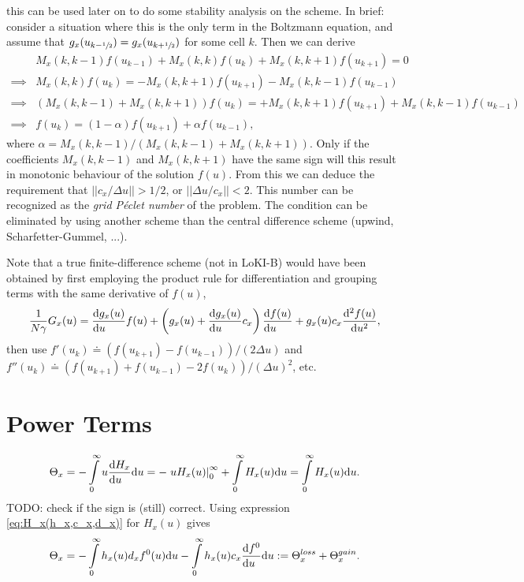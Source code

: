 \documentclass{book}
\newcommand{\frachalf}{\ensuremath{\sfrac{1}{2}}}
\newcommand{\phalf}[1]{\ensuremath{{#1}+\frachalf}}
\newcommand{\mhalf}[1]{\ensuremath{{#1}-\frachalf}}
\begin{document}
this can be used later on to do some stability analysis on the scheme. In brief:
consider a situation where this is the only term in the Boltzmann equation, and
assume that $g_x(u_{\mhalf{k}})=g_x(u_{\phalf{k}})$ for some cell $k$. Then we can
derive
\begin{align}
  &M_x(k,k-1)f(u_{k-1}) + M_x(k,k)f(u_k) + M_x(k,k+1)f(u_{k+1}) = 0 \nonumber \\
  \implies & M_x(k,k)f(u_k) = - M_x(k,k+1)f(u_{k+1}) - M_x(k,k-1)f(u_{k-1}) \nonumber \\
  \implies & (M_x(k,k-1)+M_x(k,k+1))f(u_k) = + M_x(k,k+1)f(u_{k+1}) + M_x(k,k-1)f(u_{k-1}) \nonumber \\
  \implies & f(u_k) = (1-\alpha)f(u_{k+1}) + \alpha f(u_{k-1}),
\end{align}
where $\alpha=M_x(k,k-1)/(M_x(k,k-1)+M_x(k,k+1))$. Only if the coefficients $M_x(k,k-1)$
and $M_x(k,k+1)$ have the same sign will this result in monotonic behaviour of the solution
$f(u)$. From this we can deduce the requirement that $||c_x/\Delta u||>1/2$, or
$||\Delta u/c_x||<2$. This number can be recognized as the {\em grid P\'eclet number}
of the problem. The condition can be eliminated by using another scheme than the
central difference scheme (upwind, Scharfetter-Gummel, ...).

Note that a true finite-difference scheme (not in LoKI-B) would have been obtained by
first employing the product rule for differentiation and grouping terms with the
same derivative of $f(u)$,
\begin{equation}
  \frac{1}{N\gamma}G_x(u)
    = \DERIV{g_x(u)}{u}f(u)
    + \left(g_x(u)+\DERIV{g_x(u)}{u}c_x\right)\DERIV{f(u)}{u}
    + g_x(u)c_x\DDERIV{f(u)}{u},
\end{equation}
then use $f'(u_k)\doteq(f(u_{k+1})-f(u_{k-1}))/(2\Delta u)$ and
$f''(u_k)\doteq(f(u_{k+1})+f(u_{k-1})-2f(u_k))/(\Delta u)^2$, etc.

\section{Power Terms}
\label{sec:old-power-terms}

\begin{equation}
	\Theta_x
		= -\int\limits_0^\infty u\DERIV{H_x}{u}\dd{u}
		= -\left.uH_x(u)\right|_0^\infty + \int\limits_0^\infty H_x(u)\dd{u}
		=   \int\limits_0^\infty H_x(u)\dd{u}.
\end{equation}
TODO: check if the sign is (still) correct.
Using expression \eqref{eq:H_x(h_x,c_x,d_x)} for $H_x(u)$ gives
\begin{equation}
	\Theta_x
	= -\int\limits_0^\infty h_x(u)d_xf^0(u)\dd{u} - \int\limits_0^\infty h_x(u)c_x\DERIV{f^0}{u}\dd{u}
	:= \Theta_x^{loss} + \Theta_x^{gain}.
\end{equation}
\end{document}
